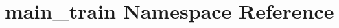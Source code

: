 \hypertarget{namespacemain__train}{}\section{main\+\_\+train Namespace Reference}
\label{namespacemain__train}

